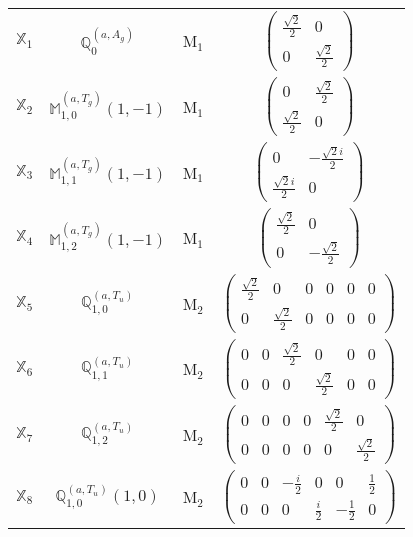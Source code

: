 \documentclass[fleqn,10pt,landscape]{article}
\begin{document}
\begin{itemize}
\begin{center}
\begin{longtable}{c|c|c|c}
$ \mathbb{X}_{1} $ & $\mathbb{Q}_{0}^{(a,A_{g})}$ & M$_{1}$ & $\begin{pmatrix} \frac{\sqrt{2}}{2} & 0 \\ 0 & \frac{\sqrt{2}}{2} \end{pmatrix}$ \\
$ \mathbb{X}_{2} $ & $\mathbb{M}_{1,0}^{(a,T_{g})}(1,-1)$ & M$_{1}$ & $\begin{pmatrix} 0 & \frac{\sqrt{2}}{2} \\ \frac{\sqrt{2}}{2} & 0 \end{pmatrix}$ \\
$ \mathbb{X}_{3} $ & $\mathbb{M}_{1,1}^{(a,T_{g})}(1,-1)$ & M$_{1}$ & $\begin{pmatrix} 0 & - \frac{\sqrt{2} i}{2} \\ \frac{\sqrt{2} i}{2} & 0 \end{pmatrix}$ \\
$ \mathbb{X}_{4} $ & $\mathbb{M}_{1,2}^{(a,T_{g})}(1,-1)$ & M$_{1}$ & $\begin{pmatrix} \frac{\sqrt{2}}{2} & 0 \\ 0 & - \frac{\sqrt{2}}{2} \end{pmatrix}$ \\ \hline
$ \mathbb{X}_{5} $ & $\mathbb{Q}_{1,0}^{(a,T_{u})}$ & M$_{2}$ & $\begin{pmatrix} \frac{\sqrt{2}}{2} & 0 & 0 & 0 & 0 & 0 \\ 0 & \frac{\sqrt{2}}{2} & 0 & 0 & 0 & 0 \end{pmatrix}$ \\
$ \mathbb{X}_{6} $ & $\mathbb{Q}_{1,1}^{(a,T_{u})}$ & M$_{2}$ & $\begin{pmatrix} 0 & 0 & \frac{\sqrt{2}}{2} & 0 & 0 & 0 \\ 0 & 0 & 0 & \frac{\sqrt{2}}{2} & 0 & 0 \end{pmatrix}$ \\
$ \mathbb{X}_{7} $ & $\mathbb{Q}_{1,2}^{(a,T_{u})}$ & M$_{2}$ & $\begin{pmatrix} 0 & 0 & 0 & 0 & \frac{\sqrt{2}}{2} & 0 \\ 0 & 0 & 0 & 0 & 0 & \frac{\sqrt{2}}{2} \end{pmatrix}$ \\
$ \mathbb{X}_{8} $ & $\mathbb{Q}_{1,0}^{(a,T_{u})}(1,0)$ & M$_{2}$ & $\begin{pmatrix} 0 & 0 & - \frac{i}{2} & 0 & 0 & \frac{1}{2} \\ 0 & 0 & 0 & \frac{i}{2} & - \frac{1}{2} & 0 \end{pmatrix}$ \\

\end{longtable}
\end{center}
\end{itemize}
\end{document}
